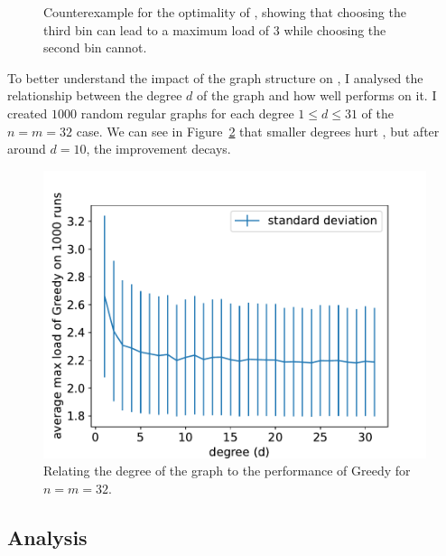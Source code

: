 \begin{figure}
    \centering
    \caption{Counterexample for the optimality of \Greedy, showing that choosing the third bin can lead to a maximum load of $3$ while choosing the second bin cannot.}
    \label{greedy-counterexample}
\end{figure}



To better understand the impact of the graph structure on \Greedy, I analysed the relationship between the degree $d$ of the graph and how well \Greedy performs on it. I created $1000$ random regular graphs for each degree $1\leq d \leq 31$ of the $n=m=32$ case. We can see in Figure~\ref{greedy-random-regular-analysis} that smaller degrees hurt \Greedy, but after around $d=10$, the improvement decays.


\begin{figure}[h]
    \centering
    \includegraphics[scale=0.6]{Chapter4/Figs/greedy_degree_analysis_32_32.pdf}
    \caption{Relating the degree of the graph to the performance of Greedy for $n=m=32$.}
    \label{greedy-random-regular-analysis}
\end{figure}


\subsection{\DQL Analysis} \label{dql-analysis-graphical-two-choice}

